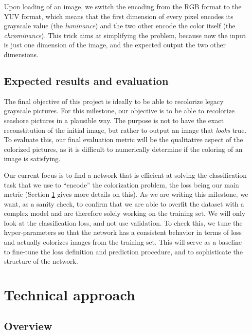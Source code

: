 \documentclass[10pt,twocolumn,letterpaper]{article}
\begin{document}
Upon loading of an image, we switch the encoding from the RGB format to the YUV format, which means that the first dimension of every pixel encodes its grayscale value (the \textit{luminance}) and the two other encode the color itself (the \textit{chrominance}). This trick aims at simplifying the problem, because now the input is just one dimension of the image, and the expected output the two other dimensions.

\subsection{Expected results and evaluation}


The final objective of this project is ideally to be able to recolorize legacy grayscale pictures. For this milestone, our objective is to be able to recolorize seashore pictures in a plausible way. The purpose is not to have the exact reconstitution of the initial image, but rather to output an image that \textit{looks} true. To evaluate this, our final evaluation metric will be the qualitative aspect of the colorized pictures, as it is difficult to numerically determine if the coloring of an image is satisfying.

Our current focus is to find a network that is efficient at solving the classification task that we use to ``encode'' the colorization problem, the loss being our main metric (Section \ref{overview} gives more details on this). As we are writing this milestone, we want, as a sanity check, to confirm that we are able to overfit the dataset with a complex model and are therefore solely working on the training set. We will only look at the classification loss, and not use validation. To check this, we tune the hyper-parameters so that the network has a consistent behavior in terms of loss and actually colorizes images from the training set.
This will serve as a baseline to fine-tune the loss definition and prediction procedure, and to sophisticate the structure of the network.

\section{Technical approach} \label{overview}

\subsection{Overview}
\end{document}
